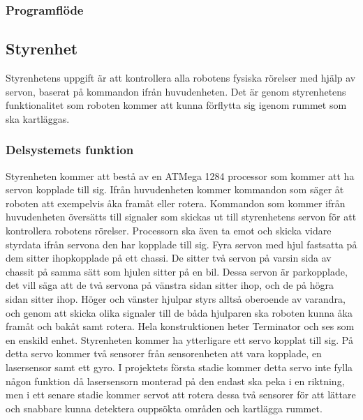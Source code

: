 \documentclass{article}
\begin{document}
\subsubsection{Programflöde}

\clearpage

\subsection{Styrenhet}
Styrenhetens uppgift är att kontrollera alla robotens fysiska rörelser med hjälp av servon, baserat på kommandon ifrån huvudenheten. Det är genom styrenhetens funktionalitet  som roboten kommer att kunna förflytta sig igenom rummet som ska kartläggas.
 
\subsubsection{Delsystemets funktion}
Styrenheten kommer att bestå av en ATMega 1284 processor som kommer att ha servon kopplade till sig. Ifrån huvudenheten kommer kommandon som säger åt roboten att exempelvis åka framåt eller rotera. Kommandon som kommer ifrån huvudenheten översätts till signaler som skickas ut till styrenhetens servon för att kontrollera robotens rörelser. Processorn ska även ta emot och skicka vidare styrdata ifrån servona den har kopplade till sig.
\newline\newline
Fyra servon med hjul fastsatta på dem sitter ihopkopplade på ett chassi. De sitter två servon på varsin sida av chassit på samma sätt som hjulen sitter på en bil. Dessa servon är parkopplade, det vill säga att de två servona på vänstra sidan sitter ihop, och de på högra sidan sitter ihop. Höger och vänster hjulpar styrs alltså oberoende av varandra, och genom att skicka olika signaler till de båda hjulparen ska roboten kunna åka framåt och bakåt samt rotera. Hela konstruktionen heter Terminator och ses som en enskild enhet.
\newline\newline
Styrenheten kommer ha ytterligare ett servo kopplat till sig. På detta servo kommer två sensorer från sensorenheten att vara kopplade, en lasersensor samt ett gyro. I projektets första stadie kommer detta servo inte fylla någon funktion då lasersensorn monterad på den endast ska peka i en riktning, men i ett senare stadie kommer servot att rotera dessa två sensorer för att lättare och snabbare kunna detektera ouppsökta områden och kartlägga rummet.
\end{document}
